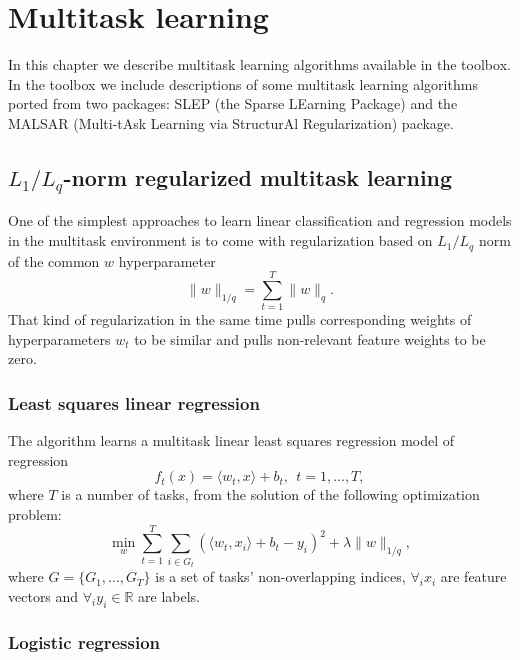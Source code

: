 %

\chapter{Multitask learning}

In this chapter we describe multitask learning algorithms available in the 
\shogun{} toolbox. In the toolbox we include descriptions of some multitask 
learning algorithms ported from two packages: SLEP (the Sparse LEarning 
Package) and the MALSAR (Multi-tAsk Learning via StructurAl Regularization) 
package.

\section{$L_1/L_q$-norm regularized multitask learning}

One of the simplest approaches to learn linear classification and regression models in the 
multitask environment is to come with regularization based on $L_1/L_q$ norm 
of the common $w$ hyperparameter
$$
\| w \|_{1/q} = \sum_{t=1}^{T} \| w \|_q.
$$ 
That kind of regularization in the same time pulls corresponding weights 
of hyperparameters $w_t$ to be similar and pulls non-relevant feature weights
to be zero.

\subsection{Least squares linear regression}

The algorithm learns a multitask linear least squares regression model of regression 
$$
f_t(x) = \langle w_t,x \rangle + b_t, ~~ t = 1, \dots, T,
$$
where $T$ is a number of tasks, from the solution of the following optimization problem:
$$
\min_w \sum_{t=1}^{T} \sum_{i \in G_t} \left(\langle w_t,x_i \rangle + b_t - y_i\right)^2
+ \lambda \| w \|_{1/q},
$$
where $G = \{ G_1, \dots, G_T \}$ is a set of tasks' non-overlapping indices, $\forall_i x_i$ are feature 
vectors and $\forall_i y_i \in \mathbb{R}$ are labels.

\subsection{Logistic regression}

